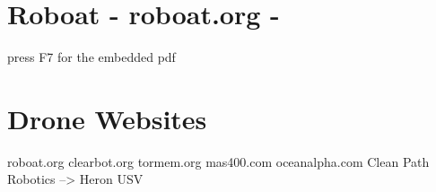 \documentclass{article}
\begin{document}
	
\section{Roboat - roboat.org -} 



	
press F7 for the embedded pdf
\section{Drone Websites}

roboat.org
clearbot.org
tormem.org
mas400.com
oceanalpha.com
Clean Path Robotics --> Heron USV
\end{document}
